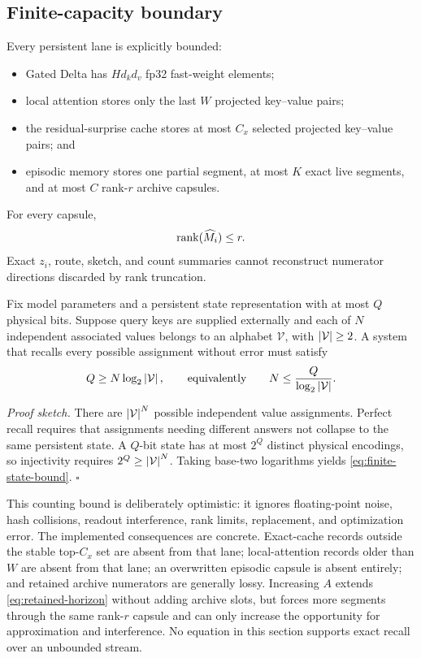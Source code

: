 \subsection{Finite-capacity boundary}
\label{subsec:finite-capacity}

Every persistent lane is explicitly bounded:
\begin{itemize}
  \item Gated Delta has \(Hd_kd_v\) fp32 fast-weight elements;
  \item local attention stores only the last \(W\) projected key--value pairs;
  \item the residual-surprise cache stores at most \(C_x\) selected projected
        key--value pairs; and
  \item episodic memory stores one partial segment, at most \(K\) exact live
        segments, and at most \(C\) rank-\(r\) archive capsules.
\end{itemize}
For every capsule,
\begin{equation}
  \operatorname{rank}(\widehat M_i)\leq r.
\end{equation}
Exact \(z_i\), route, sketch, and count summaries cannot reconstruct numerator
directions discarded by rank truncation.

\begin{proposition}
\label{prop:finite-state-impossibility}
Fix model parameters and a persistent state representation with at most
\(Q\) physical bits.  Suppose query keys are supplied externally and each of
\(N\) independent associated values belongs to an alphabet
\(\mathcal V\), with \(\left\lvert \mathcal V\right\rvert\geq2\).  A system that recalls every
possible assignment without error must satisfy
\begin{equation}
  Q\geq N\log_2\left\lvert \mathcal V\right\rvert,
  \qquad\text{equivalently}\qquad
  N\leq\frac{Q}{\log_2\left\lvert \mathcal V\right\rvert}.
  \label{eq:finite-state-bound}
\end{equation}
\end{proposition}
\noindent\emph{Proof sketch.}
There are \(\left\lvert \mathcal V\right\rvert^N\) possible independent value assignments.
Perfect recall requires that assignments needing different answers not collapse
to the same persistent state.  A \(Q\)-bit state has at most \(2^Q\) distinct
physical encodings, so injectivity requires
\(2^Q\geq\left\lvert \mathcal V\right\rvert^N\).  Taking base-two logarithms yields
\eqref{eq:finite-state-bound}. \hfill\(\square\)

This counting bound is deliberately optimistic: it ignores floating-point
noise, hash collisions, readout interference, rank limits, replacement, and
optimization error.  The implemented consequences are concrete.  Exact-cache
records outside the stable top-\(C_x\) set are absent from that lane;
local-attention records older than \(W\) are absent from that lane; an
overwritten episodic capsule is absent entirely; and retained archive
numerators are generally lossy.  Increasing \(A\) extends
\eqref{eq:retained-horizon} without adding archive slots, but forces more
segments through the same rank-\(r\) capsule and can only increase the
opportunity for approximation and interference.  No equation in this section
supports exact recall over an unbounded stream.

